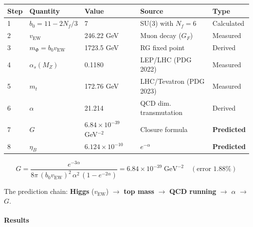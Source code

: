 \documentclass[
  11pt,
]{article}
\begin{document}
\begin{longtable}[]{@{}lllll@{}}
\toprule
Step & Quantity & Value & Source & Type\tabularnewline
\midrule
\endhead
1 & \(b_0 = 11 - 2N_f/3\) & 7 & SU(3) with \(N_f = 6\) &
Calculated\tabularnewline
2 & \(v_\text{EW}\) & 246.22 GeV & Muon decay (\(G_F\)) &
Measured\tabularnewline
3 & \(m_\Phi = b_0 v_\text{EW}\) & 1723.5 GeV & RG fixed point &
Derived\tabularnewline
4 & \(\alpha_s(M_Z)\) & 0.1180 & LEP/LHC (PDG 2022) &
Measured\tabularnewline
5 & \(m_t\) & 172.76 GeV & LHC/Tevatron (PDG 2023) &
Measured\tabularnewline
6 & \(\alpha\) & 21.214 & QCD dim. transmutation &
Derived\tabularnewline
7 & \(G\) & \(6.84 \times 10^{-39}\) GeV\(^{-2}\) & Closure formula &
\textbf{Predicted}\tabularnewline
8 & \(\eta_B\) & \(6.124 \times 10^{-10}\) & \(e^{-\alpha}\) &
\textbf{Predicted}\tabularnewline
\bottomrule
\end{longtable}

\[\boxed{G = \frac{e^{-3\alpha}}{8\pi\,(b_0 v_\text{EW})^2\,\alpha^2\,(1 - e^{-2\alpha})} = 6.84 \times 10^{-39}\;\text{GeV}^{-2} \quad (\text{error } 1.88\%)} \tag{156}\]

The prediction chain: \textbf{Higgs} (\(v_\text{EW}\)) \(\to\)
\textbf{top mass} \(\to\) \textbf{QCD running} \(\to\) \(\alpha\)
\(\to\) \(G\).

\bigskip

\hypertarget{results-10}{%
\paragraph{Results}\label{results-10}}
\end{document}
